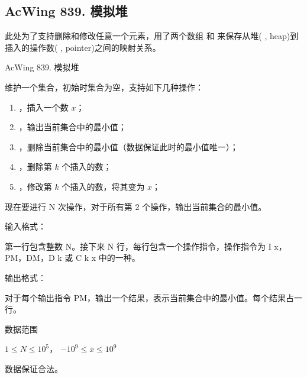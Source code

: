 \subsection{AcWing 839. 模拟堆}

此处为了支持删除和修改任意一个元素，用了两个数组  和  来保存从堆(  , heap)到插入的操作数(  , pointer)之间的映射关系。

\begin{titledbox}{AcWing 839. 模拟堆}

    维护一个集合，初始时集合为空，支持如下几种操作：

    \begin{enumerate}
        \itemsep=-5pt
        \item {}，插入一个数 $x$；
        \item {}，输出当前集合中的最小值；
        \item {}，删除当前集合中的最小值（数据保证此时的最小值唯一）；
        \item {}，删除第 $k$ 个插入的数；
        \item {}，修改第 $k$ 个插入的数，将其变为 $x$；
    \end{enumerate}

    现在要进行 N 次操作，对于所有第 2 个操作，输出当前集合的最小值。

    输入格式：

    第一行包含整数 N。接下来 N 行，每行包含一个操作指令，操作指令为 I x，PM，DM，D k 或 C k x 中的一种。

    输出格式：

    对于每个输出指令 PM，输出一个结果，表示当前集合中的最小值。每个结果占一行。

    数据范围

    $1 \le N \le 10^5$， $−10^9 \le x \le 10^9$

    数据保证合法。

    \begin{inputblock}
         \\
         \\
         \\
         \\
         \\
         \\
         \\
         \\
    \end{inputblock}
    \begin{outputblock}
         \\
    \end{outputblock}
\end{titledbox}


